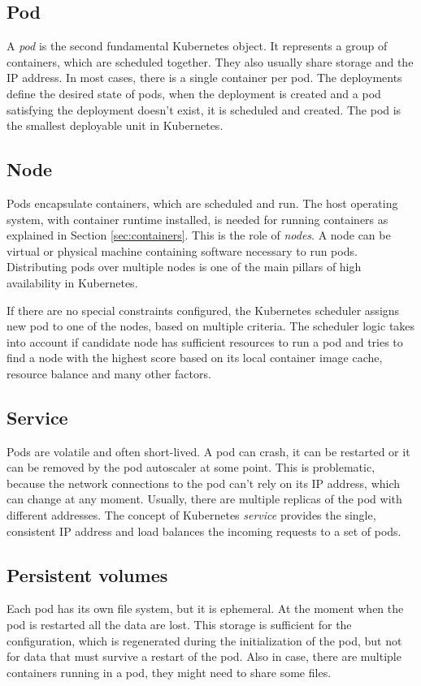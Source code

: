 \documentclass[
  digital, %
  twoside, %
  table,   %
  nolof,   %
  nolot,   %
]{fithesis3}
\begin{document}
\subsection{Pod} \label{sec:pod}
A \textit{pod} is the second fundamental Kubernetes object. It represents a group of containers, which are scheduled together. They also usually share storage and the IP address. In most cases, there is a single container per pod. The deployments define the desired state of pods, when the deployment is created and a pod satisfying the deployment doesn't exist, it is scheduled and created. The pod is the smallest deployable unit in Kubernetes.

\subsection{Node} \label{sec:node}
Pods encapsulate containers, which are scheduled and run. The host operating system, with container runtime installed, is needed for running containers as explained in Section \ref{sec:containers}. This is the role of \textit{nodes}. A node can be virtual or physical machine containing software necessary to run pods. Distributing pods over multiple nodes is one of the main pillars of high availability in Kubernetes.

If there are no special constraints configured, the Kubernetes scheduler \cite{kube-scheduler} assigns new pod to one of the nodes, based on multiple criteria. The scheduler logic takes into account if candidate node has sufficient resources to run a pod and tries to find a node with the highest score based on its local container image cache, resource balance and many other factors.

\subsection{Service} \label{sec:service}
Pods are volatile and often short-lived. A pod can crash, it can be restarted or it can be removed by the pod autoscaler \cite{hpa} at some point. This is problematic, because the network connections to the pod can't rely on its IP address, which can change at any moment. Usually, there are multiple replicas of the pod with different addresses. The concept of Kubernetes \textit{service} provides the single, consistent IP address and load balances the incoming requests to a set of pods.

\subsection{Persistent volumes} \label{sec:pv}
Each pod has its own file system, but it is ephemeral. At the moment when the pod is restarted all the data are lost. This storage is sufficient for the configuration, which is regenerated during the initialization of the pod, but not for data that must survive a restart of the pod. Also in case, there are multiple containers running in a pod, they might need to share some files.
\end{document}
